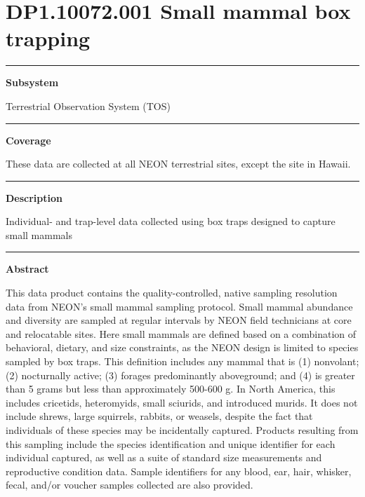 \documentclass[]{article}
\begin{document}
\section{DP1.10072.001 Small mammal box
trapping}\label{dp1.10072.001-small-mammal-box-trapping}

\begin{center}\rule{0.5\linewidth}{\linethickness}\end{center}

\textbf{Subsystem}

Terrestrial Observation System (TOS)

\begin{center}\rule{0.5\linewidth}{\linethickness}\end{center}

\textbf{Coverage}

These data are collected at all NEON terrestrial sites, except the site
in Hawaii.

\begin{center}\rule{0.5\linewidth}{\linethickness}\end{center}

\textbf{Description}

Individual- and trap-level data collected using box traps designed to
capture small mammals

\begin{center}\rule{0.5\linewidth}{\linethickness}\end{center}

\textbf{Abstract}

This data product contains the quality-controlled, native sampling
resolution data from NEON's small mammal sampling protocol. Small mammal
abundance and diversity are sampled at regular intervals by NEON field
technicians at core and relocatable sites. Here small mammals are
defined based on a combination of behavioral, dietary, and size
constraints, as the NEON design is limited to species sampled by box
traps. This definition includes any mammal that is (1) nonvolant; (2)
nocturnally active; (3) forages predominantly aboveground; and (4) is
greater than 5 grams but less than approximately 500-600 g. In North
America, this includes cricetids, heteromyids, small sciurids, and
introduced murids. It does not include shrews, large squirrels, rabbits,
or weasels, despite the fact that individuals of these species may be
incidentally captured. Products resulting from this sampling include the
species identification and unique identifier for each individual
captured, as well as a suite of standard size measurements and
reproductive condition data. Sample identifiers for any blood, ear,
hair, whisker, fecal, and/or voucher samples collected are also
provided.
\end{document}
